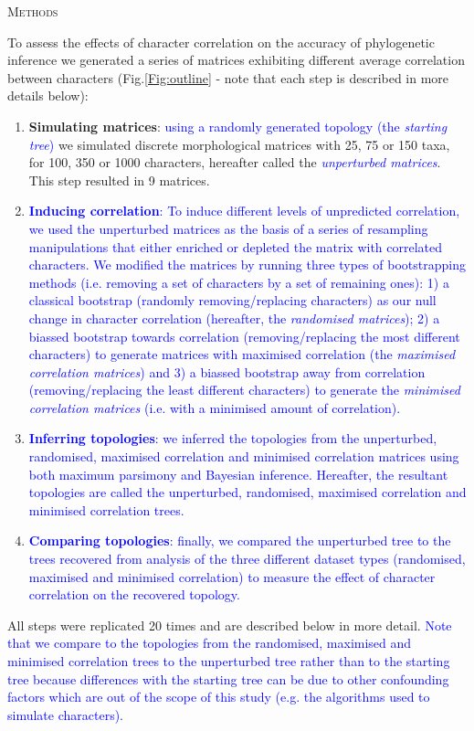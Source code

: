 \documentclass[12pt,letterpaper]{article}
\renewcommand{\section}[1]{%
\bigskip
\begin{center}
\begin{Large}
\normalfont\scshape #1
\medskip
\end{Large}
\end{center}}
\begin{document}
\section{Methods}
To assess the effects of character correlation on the accuracy of phylogenetic inference we generated a series of matrices exhibiting different average correlation between characters (Fig.\ref{Fig:outline} - note that each step is described in more details below):
\begin{enumerate}
    \item \textbf{Simulating matrices}: \textcolor{blue}{using a randomly generated topology (the \textit{starting tree})} we simulated discrete morphological matrices with 25, 75 or 150 taxa, for 100, 350 or 1000 characters, hereafter called the \textcolor{blue}{\textit{unperturbed matrices}}.
    This step resulted in 9 matrices.

    \item \textcolor{blue}{\textbf{Inducing correlation}: To induce different levels of unpredicted correlation, we used the unperturbed matrices as the basis of a series of resampling manipulations that either enriched or depleted the matrix with correlated characters.
    We modified the matrices by running three types of bootstrapping methods (i.e. removing a set of characters by a set of remaining ones): 1) a classical bootstrap (randomly removing/replacing characters) as our null change in character correlation (hereafter, the \textit{randomised matrices}); 2) a biassed bootstrap towards correlation (removing/replacing the most different characters) to generate matrices with maximised correlation (the \textit{maximised correlation matrices}) and 3) a biassed bootstrap away from correlation (removing/replacing the least different characters) to generate the \textit{minimised correlation matrices} (i.e. with a minimised amount of correlation).}

    \item \textcolor{blue}{\textbf{Inferring topologies}: we inferred the topologies from the unperturbed, randomised, maximised correlation and minimised correlation matrices using both maximum parsimony and Bayesian inference. Hereafter, the resultant topologies are called the unperturbed, randomised, maximised correlation and minimised correlation trees.}

    \item \textcolor{blue}{\textbf{Comparing topologies}: finally, we compared the unperturbed tree to the trees recovered from analysis of the three different dataset types (randomised, maximised and minimised correlation) to measure the effect of character correlation on the recovered topology.}

\end{enumerate}
All steps were replicated 20 times and are described below in more detail.
\textcolor{blue}{Note that we compare to the topologies from the randomised, maximised and minimised correlation trees to the unperturbed tree rather than to the starting tree because differences with the starting tree can be due to other confounding factors which are out of the scope of this study (e.g. the algorithms used to simulate characters).}
\end{document}

